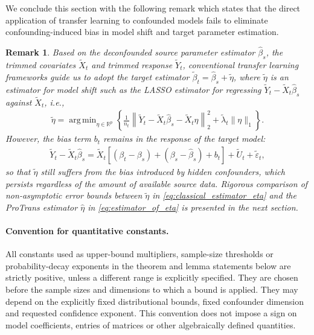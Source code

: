 \documentclass[12pt]{article}
\newtheorem{remark}{Remark}
\DeclareMathOperator*{\argmin}{arg\,min}
\begin{document}
We conclude this section with the following remark which states that the direct application of transfer learning to confounded models fails to eliminate confounding-induced bias in model shift and target parameter estimation.
\begin{remark}
\label{remark:classical_transfer_learning}
 Based on the deconfounded source parameter estimator $\hat{\beta}_s$, the trimmed covariates $\tilde{X}_t$ and trimmed response $\tilde{Y}_t$, conventional transfer learning frameworks guide us to adopt the target estimator $\tilde{\beta}_t = \hat{\beta}_s +\tilde{\eta}$, where $\tilde{\eta}$ is an estimator for model shift such as the LASSO estimator for regressing $\tilde{Y}_t - \tilde{X}_t\hat{\beta}_s$ against $\tilde{X}_t$, i.e.,
\begin{align}
\label{eq:classical_estimator_eta}
    \tilde{\eta} = \argmin_{\eta\in \mathbb{R}^p } \left\{\frac{1}{n_t}\left\|\tilde{Y}_t - \tilde{X}_t\hat{\beta}_s - \tilde{X}_t\eta \right\|_2^2 +\tilde{\lambda}_t \|\eta\|_1\right\}. 
\end{align}
However, the bias term $b_t$ remains in the response of the target model:
\begin{align*}
    \tilde{Y}_t - \tilde{X}_t\hat{\beta}_s = \tilde{X}_t \left[\left(\beta_t - \beta_s\right) + \left(\beta_s - \hat{\beta}_s\right)+ b_t\right] + \tilde{U}_t + \tilde{\varepsilon}_t,
\end{align*}
so that $\tilde{\eta}$ still suffers from the bias introduced by hidden confounders, which persists regardless of the amount of available source data. Rigorous comparison of non-asymptotic error bounds between $\tilde{\eta}$ in \eqref{eq:classical_estimator_eta} and the ProTrans estimator $\hat{\eta}$ in \eqref{eq:estimator_of_eta} is presented in the next section. 
\end{remark}

  


\paragraph{Convention for quantitative constants.}
All constants used as upper-bound multipliers, sample-size thresholds or
probability-decay exponents in the theorem and lemma statements below are
strictly positive, unless a different range is explicitly specified. They are
chosen before the sample sizes and dimensions to which a bound is applied.
They may depend on the explicitly fixed distributional bounds, fixed
confounder dimension and requested confidence exponent. This convention does
not impose a sign on model coefficients, entries of matrices or other
algebraically defined quantities.
\end{document}
